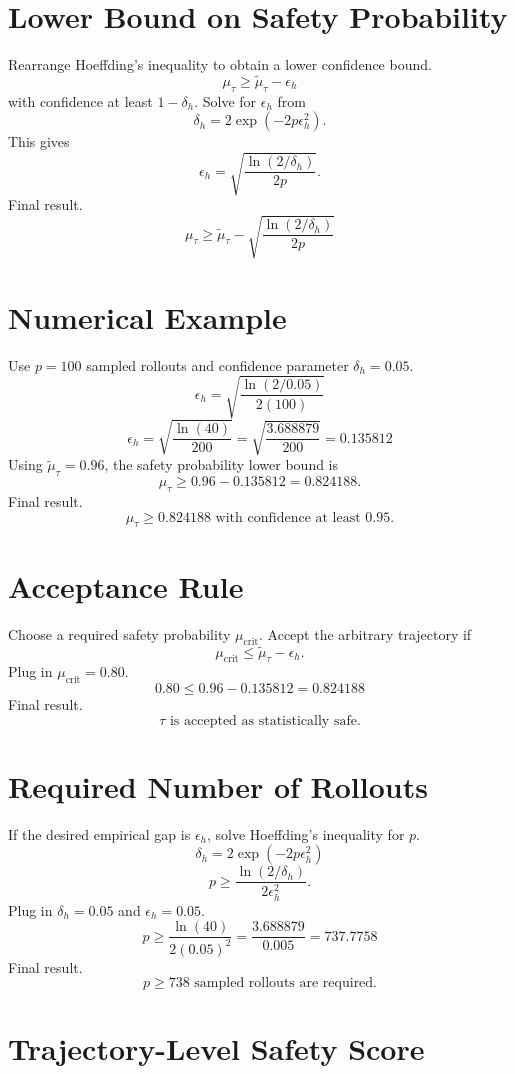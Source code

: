 \documentclass[11pt]{article}
\begin{document}
\section*{Lower Bound on Safety Probability}

Rearrange Hoeffding's inequality to obtain a lower confidence bound.
\[
\mu_\tau
\ge
\tilde\mu_\tau-\epsilon_h
\]
with confidence at least \(1-\delta_h\).
Solve for \(\epsilon_h\) from
\[
\delta_h=2\exp(-2p\epsilon_h^2).
\]
This gives
\[
\epsilon_h
=
\sqrt{
\frac{\ln(2/\delta_h)}{2p}
}.
\]
Final result.
\[
\boxed{
\mu_\tau
\ge
\tilde\mu_\tau
-
\sqrt{
\frac{\ln(2/\delta_h)}{2p}
}
}
\]

\section*{Numerical Example}

Use \(p=100\) sampled rollouts and confidence parameter \(\delta_h=0.05\).
\[
\epsilon_h
=
\sqrt{
\frac{\ln(2/0.05)}{2(100)}
}
\]
\[
\epsilon_h
=
\sqrt{
\frac{\ln(40)}{200}
}
=
\sqrt{
\frac{3.688879}{200}
}
=0.135812
\]
Using \(\tilde\mu_\tau=0.96\), the safety probability lower bound is
\[
\mu_\tau
\ge
0.96-0.135812
=0.824188.
\]
Final result.
\[
\boxed{
\mu_\tau\ge0.824188
\text{ with confidence at least }0.95.
}
\]

\section*{Acceptance Rule}

Choose a required safety probability \(\mu_{\mathrm{crit}}\).
Accept the arbitrary trajectory if
\[
\mu_{\mathrm{crit}}
\le
\tilde\mu_\tau-\epsilon_h.
\]
Plug in \(\mu_{\mathrm{crit}}=0.80\).
\[
0.80
\le
0.96-0.135812
=0.824188
\]
Final result.
\[
\boxed{\tau\text{ is accepted as statistically safe.}}
\]

\section*{Required Number of Rollouts}

If the desired empirical gap is \(\epsilon_h\), solve Hoeffding's inequality for \(p\).
\[
\delta_h=2\exp(-2p\epsilon_h^2)
\]
\[
p
\ge
\frac{\ln(2/\delta_h)}{2\epsilon_h^2}.
\]
Plug in \(\delta_h=0.05\) and \(\epsilon_h=0.05\).
\[
p
\ge
\frac{\ln(40)}{2(0.05)^2}
=
\frac{3.688879}{0.005}
=737.7758
\]
Final result.
\[
\boxed{p\ge738\text{ sampled rollouts are required.}}
\]

\section*{Trajectory-Level Safety Score}
\end{document}
